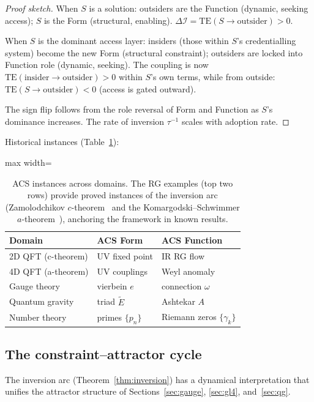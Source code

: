 \documentclass[12pt,a4paper]{article}
\theoremstyle{plain}
\theoremstyle{definition}
\theoremstyle{remark}
\newcommand{\DI}{\Delta\mathcal{I}}
\newcommand{\TE}{\mathrm{TE}}
\begin{document}
\begin{proof}[Proof sketch]
When $S$ is a solution: outsiders are the Function (dynamic, seeking access); 
$S$ is the Form (structural, enabling).  $\DI = \TE(S \to \text{outsider}) > 0$.

When $S$ is the dominant access layer: insiders (those within $S$'s 
credentialling system) become the new Form (structural constraint); 
outsiders are locked into Function role (dynamic, seeking).  
The coupling is now $\TE(\text{insider} \to \text{outsider}) > 0$ 
within $S$'s own terms, while from outside: 
$\TE(S \to \text{outsider}) < 0$ (access is gated outward).

The sign flip follows from the role reversal of Form and Function 
as $S$'s dominance increases.  The rate of inversion $\tau^{-1}$ 
scales with adoption rate.
\end{proof}

\noindent
Historical instances (Table~\ref{tab:acs-instances}):

\begin{table}[h]
\centering
\begin{adjustbox}{max width=\linewidth}\begin{tabular}{lll}
\toprule
Domain & ACS Form & ACS Function \\
\midrule
2D QFT (c-theorem) & UV fixed point & IR RG flow \\
4D QFT (a-theorem) & UV couplings & Weyl anomaly \\
Gauge theory & vierbein $e$ & connection $\omega$ \\
Quantum gravity & triad $\tilde{E}$ & Ashtekar $A$ \\
Number theory & primes $\{p_n\}$ & Riemann zeros $\{\gamma_k\}$ \\
\bottomrule
\end{tabular}\end{adjustbox}
\caption{ACS instances across domains.  The RG examples (top two rows) provide
proved instances of the inversion arc (Zamolodchikov $c$-theorem~\cite{Zamolodchikov1986} and the
Komargodski--Schwimmer $a$-theorem~\cite{KomargodskiSchwimmer2011}), anchoring the framework in known results.}
\label{tab:acs-instances}
\end{table}

\subsection{The constraint--attractor cycle}

The inversion arc (Theorem~\ref{thm:inversion}) has a dynamical interpretation
that unifies the attractor structure of Sections~\ref{sec:gauge},
\ref{sec:gl4}, and~\ref{sec:qg}.
\end{document}
